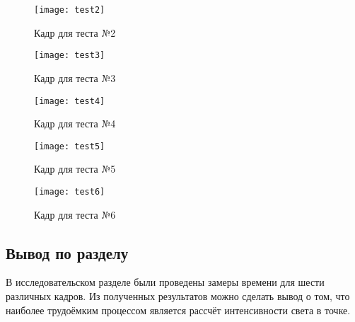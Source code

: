 \begin{figure}
	\centering
	\texttt{[image: test2]}
	\caption{Кадр для теста №2}
	\label{fig:test2}
\end{figure}

\begin{figure}
	\centering
	\texttt{[image: test3]}
	\caption{Кадр для теста №3}
	\label{fig:test3}
\end{figure}

\begin{figure}
	\centering
	\texttt{[image: test4]}
	\caption{Кадр для теста №4}
	\label{fig:test4}
\end{figure}

\begin{figure}
	\centering
	\texttt{[image: test5]}
	\caption{Кадр для теста №5}
	\label{fig:test5}
\end{figure}

\begin{figure}
	\centering
	\texttt{[image: test6]}
	\caption{Кадр для теста №6}
	\label{fig:test6}
\end{figure}

\subsection{Вывод по разделу}
В исследовательском разделе были проведены замеры времени для шести различных кадров. Из полученных результатов можно сделать вывод о том, что наиболее трудоёмким процессом является рассчёт интенсивности света в точке.
